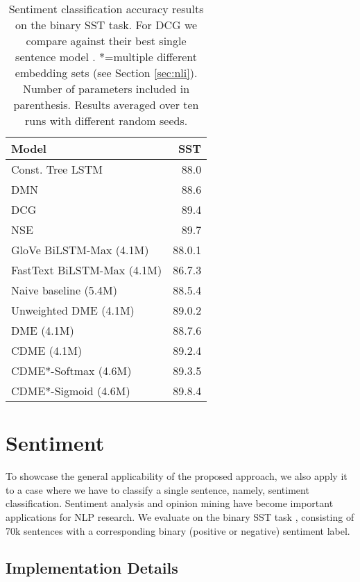 \documentclass[11pt,a4paper]{article}
\begin{document}
\begin{table}[t]
  \centering
  \begin{tabular}{lr}
    \toprule
    Model & SST\\
    \midrule
    Const. Tree LSTM \cite{Tai:2015arxiv} & 88.0\\
    DMN \cite{Kumar:2016icml} & 88.6\\
    DCG \cite{Looks:2017arxiv} & 89.4\\
    NSE \cite{Munkhdalai:2017acl} & 89.7\\
    \midrule
    GloVe BiLSTM-Max {\small (4.1M)} & 88.0.1\\
	FastText BiLSTM-Max {\small (4.1M)} & 86.7.3\\
    Naive baseline {\small (5.4M)} & 88.5.4\\\midrule
    Unweighted DME {\small (4.1M)} & 89.0.2\\
    DME {\small (4.1M)} & 88.7.6\\
    CDME {\small (4.1M)} & 89.2.4\\\midrule
    CDME*-Softmax {\small (4.6M)} & 89.3.5\\
	CDME*-Sigmoid {\small (4.6M)} & 89.8.4\\
    \bottomrule
  \end{tabular}
  \caption{\label{table:sentiment}Sentiment classification accuracy results on the binary SST task. For DCG we compare against their best single sentence model \cite{Looks:2017arxiv}. *=multiple different embedding sets (see Section \ref{sec:nli}). Number of parameters included in parenthesis. Results averaged over ten runs with different random seeds.}
\end{table}
  
\section{Sentiment}
\label{sec:sst}

To showcase the general applicability of the proposed approach, we also apply it to a case where we have to classify a single sentence, namely, sentiment classification. Sentiment analysis and opinion mining have become important applications for NLP research. We evaluate on the binary SST task \cite{Socher:2013emnlp}, consisting of 70k sentences with a corresponding binary (positive or negative) sentiment label.

\subsection{Implementation Details}
\end{document}
